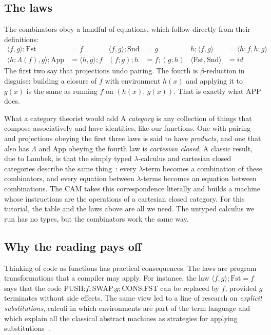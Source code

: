 \documentclass[11pt,a4paper]{article}
\newcommand{\ins}[1]{\textsf{#1}}
\newcommand{\pr}[2]{(#1,\, #2)}
\newcommand{\seq}{\mathbin{;}}
\newcommand{\cat}[1]{\mathrm{#1}}
\newcommand{\tpair}[2]{\langle #1, #2\rangle}
\theoremstyle{definition}
\theoremstyle{plain}
\begin{document}
\subsection{The laws}

The combinators obey a handful of equations, which follow directly from
their definitions:
\begin{align*}
\tpair{f}{g}\seq\cat{Fst} &= f &
\tpair{f}{g}\seq\cat{Snd} &= g &
h\seq\tpair{f}{g} &= \tpair{h\seq f}{h\seq g}\\[2pt]
\tpair{h\seq\Lambda(f)}{g}\seq\cat{App} &= \tpair{h}{g}\seq f &
(f\seq g)\seq h &= f\seq(g\seq h) &
\tpair{\cat{Fst}}{\cat{Snd}} &= \mathit{id}
\end{align*}
The first two say that projections undo pairing. The fourth is
$\beta$-reduction in disguise: building a closure of $f$ with environment
$h(x)$ and applying it to $g(x)$ is the same as running $f$ on
$\pr{h(x)}{g(x)}$. That is exactly what \ins{APP} does.

\begin{aside}{What a category theorist would add}
A \emph{category} is any collection of things that compose associatively and
have identities, like our functions. One with pairing and projections obeying
the first three laws is said to have \emph{products}, and one that also has
$\Lambda$ and $\cat{App}$ obeying the fourth law is \emph{cartesian closed}.
A classic result, due to Lambek, is that the simply typed $\lambda$-calculus
and cartesian closed categories describe the same thing~\cite{lambekscott86}:
every $\lambda$-term becomes a combination of these combinators, and every
equation between $\lambda$-terms becomes an equation between combinations.
The CAM takes this correspondence literally and builds a machine whose
instructions are the operations of a cartesian closed category. For this
tutorial, the table and the laws above are all we need. The untyped calculus
we run has no types, but the combinators work the same way.
\end{aside}

\subsection{Why the reading pays off}

Thinking of code as functions has practical consequences. The laws are
program transformations that a compiler may apply. For instance, the law
$\tpair{f}{g}\seq\cat{Fst} = f$ says that the code
\ins{PUSH}$\seq f\seq$\ins{SWAP}$\seq g\seq$\ins{CONS}$\seq$\ins{FST} can be
replaced by $f$, provided $g$ terminates without side effects. The same view
led to a line of research on \emph{explicit substitutions}, calculi in which
environments are part of the term language and which explain all the
classical abstract machines as strategies for applying
substitutions~\cite{acl91}.
\end{document}
